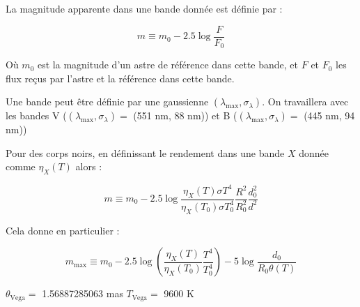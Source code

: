 \documentclass[11pt]{article} %
\begin{document}
La magnitude apparente dans une bande donnée est définie par :

\begin{equation}
m \equiv m_0 - 2.5 \log \dfrac{F}{F_0}
\end{equation}

Où $m_0$ est la magnitude d'un astre de référence dans cette bande, et $F$ et $F_0$ les flux reçus par l'astre et la référence dans cette bande.

Une bande peut être définie par une gaussienne $(\lambda_{\mbox{max}},\sigma_\lambda)$. On travaillera avec les bandes V ($(\lambda_{\mbox{max}},\sigma_\lambda) = $ (551 nm, 88 nm)) et B ($(\lambda_{\mbox{max}},\sigma_\lambda) = $ (445 nm, 94 nm))

Pour des corps noirs, en définissant le rendement dans une bande $X$ donnée comme $\eta_X(T)$ alors :

\begin{equation}
m \equiv m_0 - 2.5 \log \dfrac{\eta_X(T) \sigma T^4}{\eta_X(T_0)\sigma T_0^4} \dfrac{R^2}{R_0^2} \dfrac{d_0^2}{d^2}
\end{equation}

Cela donne en particulier :

\begin{equation}
m_{\mbox{max}} \equiv m_0 - 2.5 \log \left ( \dfrac{\eta_X(T)}{\eta_X(T_0)} \dfrac{T^4}{T_0^4}\right) - 5 \log {\dfrac{d_0}{R_0 \theta(T)}}
\end{equation}

$\theta_{\mbox{Vega}} = $ 1.56887285063 mas
$T_{\mbox{Vega}} = $ 9600 K
%
%
\end{document}
